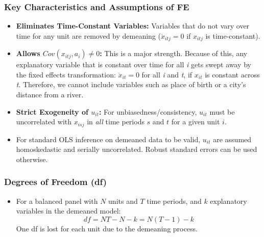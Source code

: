 \documentclass[a4paper, 10pt]{article}
\theoremstyle{definition}	%
\begin{document}
\subsubsection{Key Characteristics and Assumptions of FE}
\begin{itemize}
    \item \textbf{Eliminates Time-Constant Variables:} Variables that do not vary over time for any unit are removed by demeaning (\(\ddot{x}_{itj}=0\) if \(x_{itj}\) is time-constant).
    \item \textbf{Allows \(Cov(x_{itj}, a_i) \neq 0\):} This is a major strength. Because of this, any explanatory variable that is constant over time for all \textit{i} gets swept away by the fixed effects transformation: $\ddot{x}_{it} = 0$ for all \textit{i} and \textit{t}, if $x_{it}$ is constant across \textit{t}. Therefore, we cannot include variables such as place of birth or a city's distance from a river.
    \item \textbf{Strict Exogeneity of \(u_{it}\):} For unbiasedness/consistency, \(u_{it}\) must be uncorrelated with \(x_{isj}\) in \textit{all} time periods \(s\) and \(t\) for a given unit \(i\).
    \item For standard OLS inference on demeaned data to be valid, \(u_{it}\) are assumed homoskedastic and serially uncorrelated. Robust standard errors can be used otherwise.
\end{itemize}

\subsubsection{Degrees of Freedom (df)}
\begin{itemize}
    \item For a balanced panel with \(N\) units and \(T\) time periods, and \(k\) explanatory variables in the demeaned model:
    \[ df = NT - N - k = N(T-1) - k \]
    One df is lost for each unit due to the demeaning process.
\end{itemize}
\end{document}
